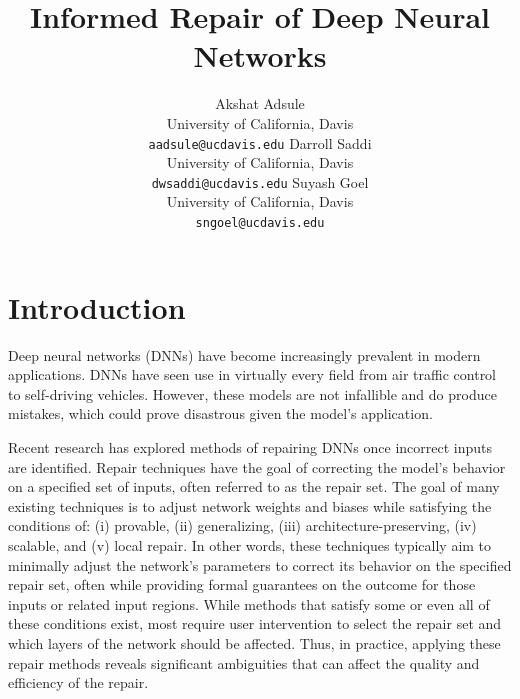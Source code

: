 \documentclass{article}
\title{Informed Repair of Deep Neural Networks}
\begin{document}
\author{
	Akshat Adsule \\
	University of California, Davis \\
	\texttt{aadsule@ucdavis.edu}
	\And
	Darroll Saddi \\
	University of California, Davis \\
	\texttt{dwsaddi@ucdavis.edu}
	\And
	Suyash Goel \\
	University of California, Davis \\
	\texttt{sngoel@ucdavis.edu}
}

\maketitle


\section{Introduction}

Deep neural networks (DNNs) have become increasingly prevalent in modern applications.
DNNs have seen use in virtually every field from air traffic control to self-driving vehicles.
However, these models are not infallible and do produce mistakes, which could prove disastrous given the model's application.

Recent research \cite{nawas_provable_2024, sotoudeh_provable_2021, tao_architecture-preserving_2023} has explored methods of repairing DNNs once incorrect inputs are identified.
Repair techniques have the goal of correcting the model's behavior on a specified set of inputs, often referred to as the repair set.
The goal of many existing techniques is to adjust network weights and biases while satisfying the conditions of: (i) provable, (ii) generalizing, (iii) architecture-preserving, (iv) scalable, and (v) local repair.
In other words, these techniques typically aim to minimally adjust the network's parameters to correct its behavior on the specified repair set, often while providing formal guarantees on the outcome for those inputs or related input regions.
While methods that satisfy some or even all of these conditions exist, most require user intervention to select the repair set and which layers of the network should be affected.
Thus, in practice, applying these repair methods reveals significant ambiguities that can affect the quality and efficiency of the repair.
\end{document}
